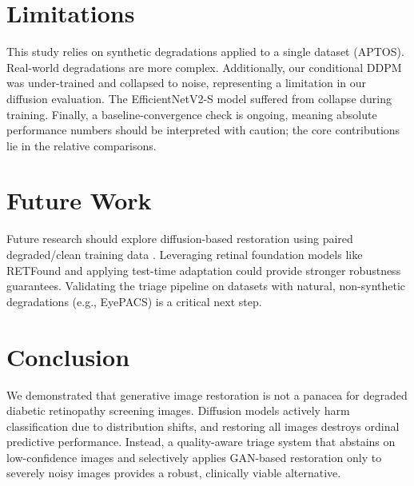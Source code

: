 \documentclass[conference]{IEEEtran}
\begin{document}
\section{Limitations}
This study relies on synthetic degradations applied to a single dataset (APTOS). Real-world degradations are more complex. Additionally, our conditional DDPM was under-trained and collapsed to noise, representing a limitation in our diffusion evaluation. The EfficientNetV2-S model suffered from collapse during training. Finally, a baseline-convergence check is ongoing, meaning absolute performance numbers should be interpreted with caution; the core contributions lie in the relative comparisons.

\section{Future Work}
Future research should explore diffusion-based restoration using paired degraded/clean training data \cite{arxiv230809388}. Leveraging retinal foundation models like RETFound \cite{zhou2023retfound} and applying test-time adaptation \cite{wang2021tent} could provide stronger robustness guarantees. Validating the triage pipeline on datasets with natural, non-synthetic degradations (e.g., EyePACS) is a critical next step.

\section{Conclusion}
We demonstrated that generative image restoration is not a panacea for degraded diabetic retinopathy screening images. Diffusion models actively harm classification due to distribution shifts, and restoring all images destroys ordinal predictive performance. Instead, a quality-aware triage system that abstains on low-confidence images and selectively applies GAN-based restoration only to severely noisy images provides a robust, clinically viable alternative.



\end{document}
